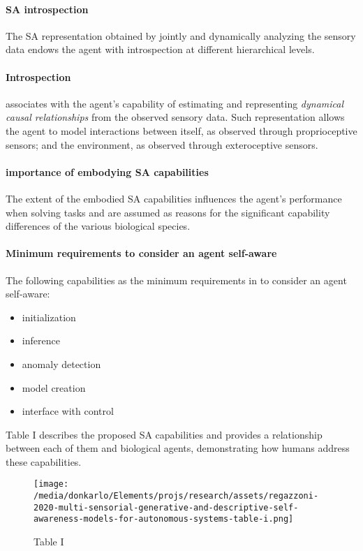 \documentclass{article}
\begin{document}
		\paragraph{SA introspection}  The SA representation obtained by jointly and dynamically analyzing the sensory data endows the agent with introspection at different hierarchical levels.
		
		\paragraph{Introspection} associates with the agent’s capability of estimating and representing \emph{dynamical causal relationships} from the observed sensory data. Such representation allows the agent to model interactions between itself, as observed through proprioceptive
		sensors; and the environment, as observed through exteroceptive sensors.
		
		\paragraph{importance of embodying SA capabilities}The extent of the embodied SA capabilities influences the agent's performance when solving tasks and are assumed as reasons for the significant capability differences of the various biological species. 
		
		\paragraph{Minimum requirements to consider an agent self-aware}The following capabilities as the minimum requirements in to consider an agent self-aware: 
		\begin{itemize}
			\item initialization
			\item inference
			\item anomaly detection
			\item model creation
			\item interface with control
		\end{itemize}
		\citet{regazzoni-2020-multi-sensorial-generative-and-descriptive-self-awareness-models-for-autonomous-systems} Table I describes the proposed SA capabilities and provides a relationship between each of them and biological agents, demonstrating how humans address these capabilities.
		\begin{figure*}
			\centering
			\texttt{[image: /media/donkarlo/Elements/projs/research/assets/regazzoni-2020-multi-sensorial-generative-and-descriptive-self-awareness-models-for-autonomous-systems-table-i.png]}
			\caption{Table I}
			\label{fig:regazzoni-2020-multi-sensorial-generative-and-descriptive-self-awareness-models-for-autonomous-systems-table-i.jpg}
		\end{figure*}
\end{document}
